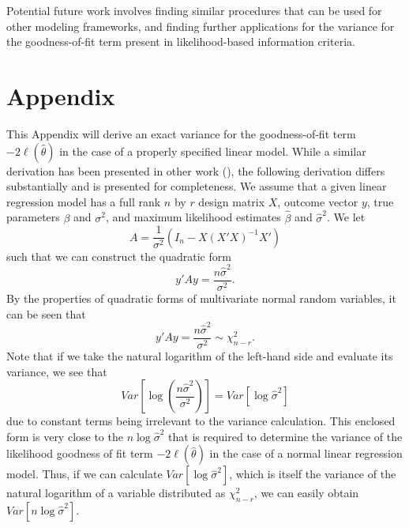 \documentclass[12pt]{article} %
\theoremstyle{definition}
\begin{document}
Potential future work involves finding similar procedures that can be used for other modeling frameworks, and finding further applications for the variance for
the goodness-of-fit term present in likelihood-based information criteria.



\section*{Appendix}

This Appendix will derive an exact variance for the goodness-of-fit term $-2 \ell (\hat{\theta} )$ in the case of a properly specified
linear model. While a similar derivation has been presented in other work (\cite{McQuarrie}), the following derivation differs substantially and is presented for completeness.
We assume that a given linear regression model has a full rank $n$ by $r$ design matrix $X$, outcome vector $y$, true parameters $\beta$ and $\sigma^2$,
and maximum likelihood estimates $\hat{\beta}$ and $\hat{\sigma}^2$. We let
\begin{equation*}
	A = \frac{1}{\sigma^2} (I_n - X(X'X)^{-1}X') 
\end{equation*}
such that we can construct the quadratic form
\begin{equation*}
	y'Ay = \frac{n \hat{\sigma}^2}{\sigma^2} .
\end{equation*}
By the properties of quadratic forms of multivariate normal random variables, it can be seen that
\begin{equation}
	y'Ay = \frac{n \hat{\sigma}^2}{\sigma^2} \sim \chi^2_{n-r} .
\end{equation}
Note that if we take the natural logarithm of the left-hand side and evaluate its variance, we see that
\begin{equation}
	Var \left[ \log(\frac{n \hat{\sigma}^2}{\sigma^2}) \right]  = Var \left[ \log \hat{\sigma}^2 \right]
\end{equation}
due to constant terms being irrelevant to the variance calculation. This enclosed form is very close to the $n \log \hat{\sigma}^2$ that is required
to determine the variance of the likelihood goodness of fit term $-2 \ell (\hat{\theta} )$ in the case of a normal linear regression model.
Thus, if we can calculate $Var \left[ \log \hat{\sigma}^2 \right]$, which is itself the variance
of the natural logarithm of a variable distributed as $\chi^2_{n-r}$, we can easily obtain $Var \left[ n \log \hat{\sigma}^2 \right]$.
\end{document}
